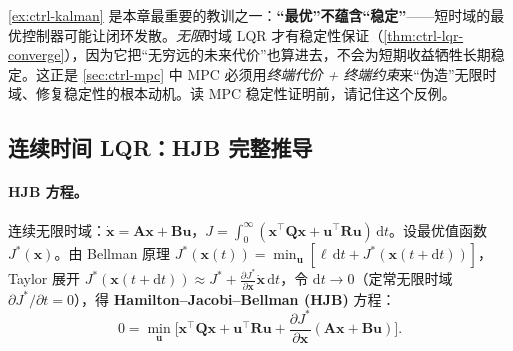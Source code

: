 \begin{insight}
\cref{ex:ctrl-kalman} 是本章最重要的教训之一：\textbf{“最优”不蕴含“稳定”}——短时域的最优控制器可能让闭环发散。\emph{无限}时域 LQR 才有稳定性保证（\cref{thm:ctrl-lqr-converge}），因为它把“无穷远的未来代价”也算进去，不会为短期收益牺牲长期稳定。这正是 \cref{sec:ctrl-mpc} 中 MPC 必须用\emph{终端代价 + 终端约束}来“伪造”无限时域、修复稳定性的根本动机。读 MPC 稳定性证明前，请记住这个反例。
\end{insight}

\subsection{连续时间 LQR：HJB 完整推导}
\label{sec:ctrl-lqr-hjb}

\paragraph{HJB 方程。}
连续无限时域：$\dot{\mathbf{x}}=\mathbf{A}\mathbf{x}+\mathbf{B}\mathbf{u}$，$J=\int_0^\infty(\mathbf{x}^\top\mathbf{Q}\mathbf{x}+\mathbf{u}^\top\mathbf{R}\mathbf{u})\,\mathrm dt$。设最优值函数 $J^*(\mathbf{x})$。由 Bellman 原理 $J^*(\mathbf{x}(t))=\min_{\mathbf{u}}[\ell\,\mathrm dt+J^*(\mathbf{x}(t+\mathrm dt))]$，Taylor 展开 $J^*(\mathbf{x}(t+\mathrm dt))\approx J^*+\frac{\partial J^*}{\partial\mathbf{x}}\dot{\mathbf{x}}\,\mathrm dt$，令 $\mathrm dt\to0$（定常无限时域 $\partial J^*/\partial t=0$），得 \textbf{Hamilton--Jacobi--Bellman (HJB)} 方程\cite{tedrake_underactuated}：
\begin{equation}
  0=\min_{\mathbf{u}}\Big[\mathbf{x}^\top\mathbf{Q}\mathbf{x}+\mathbf{u}^\top\mathbf{R}\mathbf{u}+\frac{\partial J^*}{\partial\mathbf{x}}(\mathbf{A}\mathbf{x}+\mathbf{B}\mathbf{u})\Big].
  \label{eq:ctrl-hjb}
\end{equation}

